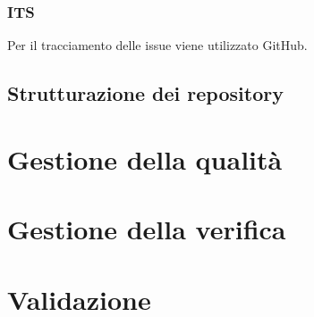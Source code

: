 \subsubsection{ITS} Per il tracciamento delle issue viene utilizzato GitHub.

\subsection{Strutturazione dei repository}


\section{Gestione della qualità}
\section{Gestione della verifica}
\section{Validazione}